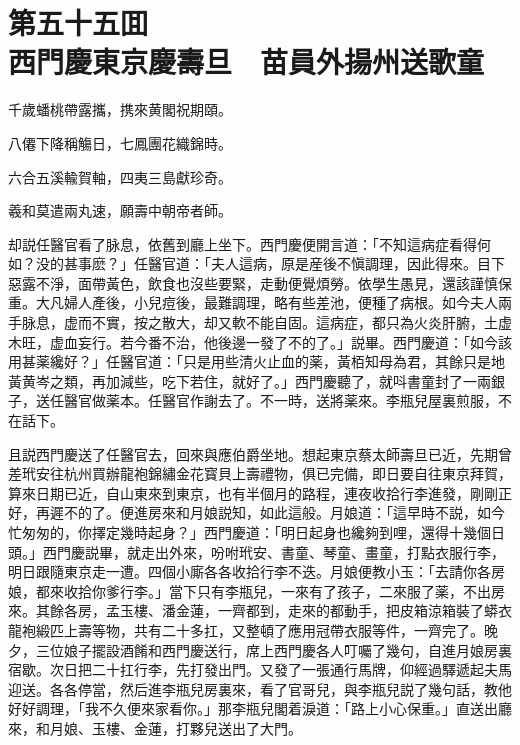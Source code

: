 
\chapter*{第五十五囬　\\西門慶東京慶壽旦　苗員外揚州送歌童}


\begin{myquote}
千歲蟠桃帶露攜，携來黄閣祝期頤。

八僊下降稱觴日，七鳳團花織錦時。

六合五溪輸賀軸，四夷三島獻珍奇。

羲和莫遣兩丸速，願壽中朝帝者師。
\end{myquote}

却説任醫官看了脉息，依舊到廳上坐下。西門慶便開言道：「不知這病症看得何如？没的甚事麽？」任醫官道：「夫人這病，原是産後不愼調理，因此得來。目下惡露不淨，面帶黃色，飲食也沒些要緊，走動便覺煩勞。依學生愚見，還該謹慎保重。大凡婦人產後，小兒痘後，最難調理，略有些差池，便種了病根。如今夫人兩手脉息，虚而不實，按之散大，却又軟不能自固。這病症，都只為火炎肝腑，土虚木旺，虚血妄行。若今番不治，他後邊一發了不的了。」説畢。西門慶道：「如今該用甚薬纔好？」任醫官道：「只是用些清火止血的薬，黃栢知母為君，其餘只是地黃黄岑之類，再加減些，吃下若住，就好了。」西門慶聽了，就呌書童封了一兩銀子，送任醫官做薬本。任醫官作謝去了。不一時，送將薬來。李瓶兒屋裏煎服，不在話下。

且説西門慶送了任醫官去，回來與應伯爵坐地。想起東京蔡太師壽旦已近，先期曾差玳安往杭州買辦龍袍錦繡金花寳貝上壽禮物，俱已完備，即日要自往東京拜賀，算來日期已近，自山東來到東京，也有半個月的路程，連夜收拾行李進發，剛剛正好，再遲不的了。便進房來和月娘説知，如此這般。月娘道：「這早時不説，如今忙匆匆的，你擇定幾時起身？」西門慶道：「明日起身也纔夠到哩，還得十幾個日頭。」西門慶説畢，就走出外來，吩咐玳安、書童、琴童、畫童，打點衣服行李，明日跟隨東京走一遭。四個小廝各各收拾行李不迭。月娘便教小玉：「去請你各房娘，都來收拾你爹行李。」當下只有李瓶兒，一來有了孩子，二來服了薬，不出房來。其餘各房，孟玉樓、潘金蓮，一齊都到，走來的都動手，把皮箱涼箱裝了蟒衣龍袍緞匹上壽等物，共有二十多扛，又整頓了應用冠帶衣服等件，一齊完了。晚夕，三位娘子擺設酒餚和西門慶送行，席上西門慶各人叮囑了幾句，自進月娘房裏宿歇。次日把二十扛行李，先打發出門。又發了一張通行馬牌，仰經過驛遞起夫馬迎送。各各停當，然后進李瓶兒房裏來，看了官哥兒，與李瓶兒説了幾句話，教他好好調理，「我不久便來家看你。」那李瓶兒閣着淚道：「路上小心保重。」直送出廳來，和月娘、玉樓、金蓮，打夥兒送出了大門。

